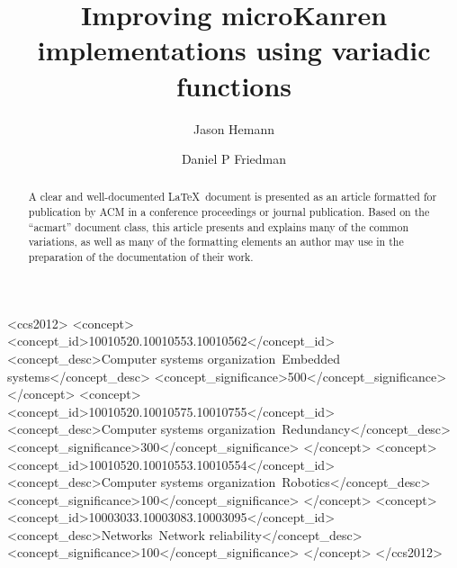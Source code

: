 \documentclass[sigplan,screen,draft,anonymous,review,natbib=false]{acmart}
\begin{document}
\title{Improving microKanren implementations using variadic functions}

\author{Jason Hemann}
\author{Daniel P Friedman}

\renewcommand{\shortauthors}{Hemann et al.}

\begin{abstract}
  A clear and well-documented \LaTeX\ document is presented as an
  article formatted for publication by ACM in a conference proceedings
  or journal publication. Based on the ``acmart'' document class, this
  article presents and explains many of the common variations, as well
  as many of the formatting elements an author may use in the
  preparation of the documentation of their work.
\end{abstract}

\begin{CCSXML}
<ccs2012>
 <concept>
  <concept_id>10010520.10010553.10010562</concept_id>
  <concept_desc>Computer systems organization~Embedded systems</concept_desc>
  <concept_significance>500</concept_significance>
 </concept>
 <concept>
  <concept_id>10010520.10010575.10010755</concept_id>
  <concept_desc>Computer systems organization~Redundancy</concept_desc>
  <concept_significance>300</concept_significance>
 </concept>
 <concept>
  <concept_id>10010520.10010553.10010554</concept_id>
  <concept_desc>Computer systems organization~Robotics</concept_desc>
  <concept_significance>100</concept_significance>
 </concept>
 <concept>
  <concept_id>10003033.10003083.10003095</concept_id>
  <concept_desc>Networks~Network reliability</concept_desc>
  <concept_significance>100</concept_significance>
 </concept>
</ccs2012>
\end{CCSXML}
\end{document}
